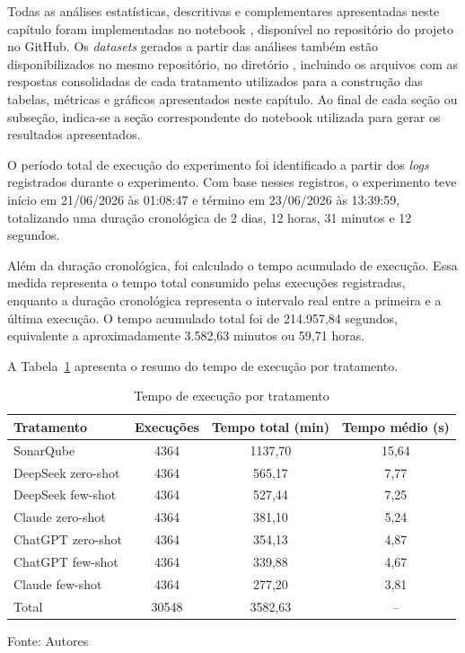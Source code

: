 Todas as análises estatísticas, descritivas e complementares apresentadas neste capítulo foram implementadas no notebook
,
disponível no repositório do projeto no GitHub. 
Os \textit{datasets} gerados a partir das análises também estão disponibilizados no mesmo repositório, no diretório
, incluindo os arquivos com as respostas consolidadas de cada tratamento utilizados para a construção das tabelas, métricas e gráficos apresentados neste capítulo. 
Ao final de cada seção ou subseção, indica-se a seção correspondente do notebook utilizada para gerar os resultados apresentados.

O período total de execução do experimento foi identificado a partir dos \textit{logs} registrados durante o experimento. Com base nesses registros, 
o experimento teve início em 21/06/2026 às 01:08:47 e término em 23/06/2026 às 13:39:59, 
totalizando uma duração cronológica de 2 dias, 12 horas, 31 minutos e 12 segundos.

Além da duração cronológica, foi calculado o tempo acumulado de execução. 
Essa medida representa o tempo total consumido pelas execuções registradas, enquanto a duração cronológica representa o intervalo real 
entre a primeira e a última execução. O tempo acumulado total foi de 214.957,84 segundos, equivalente a aproximadamente 3.582,63 minutos ou 59,71 horas.

A Tabela~\ref{tab:tempo-execucao-tratamento} apresenta o resumo do tempo de execução por tratamento.

\begin{table}[H]
\centering
\caption{Tempo de execução por tratamento}
\label{tab:tempo-execucao-tratamento}
\begin{tabular}{lccc}
\hline
Tratamento & Execuções & Tempo total (min) & Tempo médio (s) \\
\hline
SonarQube & 4364 & 1137,70 & 15,64 \\
DeepSeek zero-shot & 4364 & 565,17 & 7,77 \\
DeepSeek few-shot & 4364 & 527,44 & 7,25 \\
Claude zero-shot & 4364 & 381,10 & 5,24 \\
ChatGPT zero-shot & 4364 & 354,13 & 4,87 \\
ChatGPT few-shot & 4364 & 339,88 & 4,67 \\
Claude few-shot & 4364 & 277,20 & 3,81 \\
\hline
Total & 30548 & 3582,63 & -- \\
\hline
\end{tabular}

Fonte: Autores
\end{table}

